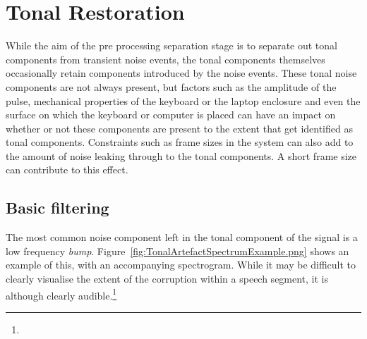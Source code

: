 %

\section{Tonal Restoration}\label{sec:TonalFiltering}
While the aim of the pre processing separation stage is to separate out tonal components from transient noise events, the tonal components themselves occasionally retain components introduced by the noise events. These tonal noise components are not always present, but factors such as the amplitude of the pulse, mechanical properties of the keyboard or the laptop enclosure and even the surface on which the keyboard or computer is placed can have an impact on whether or not these components are present to the extent that get identified as tonal components. Constraints such as frame sizes in the system can also add to the amount of noise leaking through to the tonal components. A short frame size can contribute to this effect.

\subsection{Basic filtering}\label{sec:TonalFiltering}
The most common noise component left in the tonal component of the signal is a low frequency \emph{bump}. Figure~\ref{fig:TonalArtefactSpectrumExample.png} shows an example of this, with an accompanying spectrogram. While it may be difficult to clearly visualise the extent of the corruption within a speech segment, it is although clearly audible.\footnote{}

